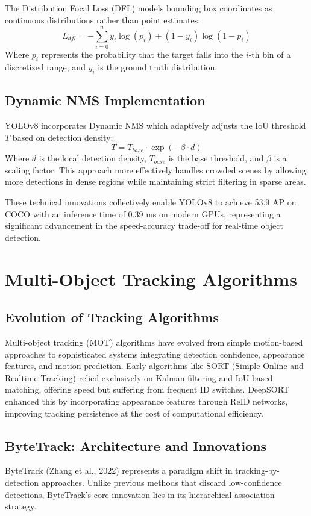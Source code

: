 \documentclass[11pt]{article}
\begin{document}
The Distribution Focal Loss (DFL) models bounding box coordinates as continuous distributions rather than point estimates:
\begin{equation}
L_{dfl} = -\sum_{i=0}^{n} y_i \log(p_i) + (1-y_i)\log(1-p_i)
\end{equation}
Where $p_i$ represents the probability that the target falls into the $i$-th bin of a discretized range, and $y_i$ is the ground truth distribution.

\subsection{Dynamic NMS Implementation}
YOLOv8 incorporates Dynamic NMS which adaptively adjusts the IoU threshold $T$ based on detection density:
\begin{equation}
T = T_{base} \cdot \exp(-\beta \cdot d)
\end{equation}
Where $d$ is the local detection density, $T_{base}$ is the base threshold, and $\beta$ is a scaling factor. This approach more effectively handles crowded scenes by allowing more detections in dense regions while maintaining strict filtering in sparse areas.

These technical innovations collectively enable YOLOv8 to achieve 53.9 AP on COCO with an inference time of 0.39 ms on modern GPUs, representing a significant advancement in the speed-accuracy trade-off for real-time object detection.

\section{Multi-Object Tracking Algorithms}

\subsection{Evolution of Tracking Algorithms}
Multi-object tracking (MOT) algorithms have evolved from simple motion-based approaches to sophisticated systems integrating detection confidence, appearance features, and motion prediction. Early algorithms like SORT (Simple Online and Realtime Tracking) relied exclusively on Kalman filtering and IoU-based matching, offering speed but suffering from frequent ID switches. DeepSORT enhanced this by incorporating appearance features through ReID networks, improving tracking persistence at the cost of computational efficiency.

\subsection{ByteTrack: Architecture and Innovations}
ByteTrack (Zhang et al., 2022) represents a paradigm shift in tracking-by-detection approaches. Unlike previous methods that discard low-confidence detections, ByteTrack's core innovation lies in its hierarchical association strategy.
\end{document}

